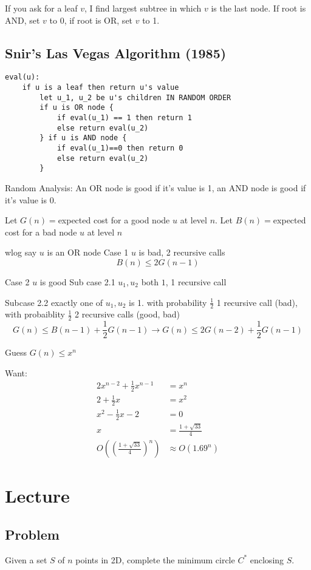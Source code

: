 \documentclass[english,12pt]{article}
\theoremstyle{plain}
\theoremstyle{definition}
\theoremstyle{definition} %
\begin{document}
If you ask for a leaf $v$, I find largest subtree in which $v$ is the last node.  If root is AND, set $v$ to 0, if root is OR, set $v$ to 1.

\subsection{Snir's Las Vegas Algorithm (1985)}
\begin{verbatim}
eval(u):
    if u is a leaf then return u's value
        let u_1, u_2 be u's children IN RANDOM ORDER
        if u is OR node {
            if eval(u_1) == 1 then return 1
            else return eval(u_2)
        } if u is AND node {
            if eval(u_1)==0 then return 0
            else return eval(u_2)
        }
\end{verbatim}

Random Analysis: An OR node is good if it's value is 1, an AND node is good if it's value is 0.

Let $G(n)=$expected cost for a good node $u$ at level $n$.  Let $B(n)=$expected cost for a bad node $u$ at level $n$

wlog say $u$ is an OR node
Case 1 $u$ is bad, 2 recursive calls
\[B(n)\le 2 G(n-1)\]

Case 2 $u$ is good
Sub case 2.1 $u_1, u_2$ both $1$, 1 recursive call

Subcase 2.2 exactly one of $u_1,u_2$ is 1.  with probability $\frac{1}{2}$ 1 recursive call (bad), with probaiblity $\frac{1}{2}$ 2 recursive calls (good, bad)
\[G(n)\le B(n-1)+\frac{1}{2}G(n-1)\rightarrow G(n) \le 2 G(n-2) + \frac{1}{2}G(n-1)\]

Guess $G(n)\le x^n$

Want:
\begin{align*}
2x^{n-2}+\frac{1}{2}x^{n-1}&=x^n\\
2 + \frac{1}{2}x&=x^2\\
x^2-\frac{1}{2}x-2&=0\\
x&= \frac{1+\sqrt{33}}{4}\\
O\left(\left(\frac{1+\sqrt{33}}{4}\right)^n\right)&\approx O(1.69^n)
\end{align*}

\section{Lecture}
\subsection{Problem}
Given a set $S$ of $n$ points in 2D, complete the minimum circle $C^\ast$ enclosing $S$.
\end{document}
